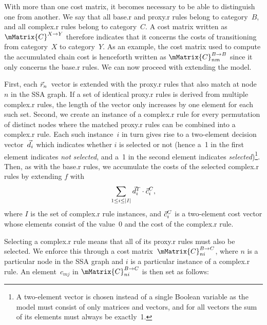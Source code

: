 With more than one cost matrix, it becomes necessary to be able to distinguish
one from another.
%
\newcommand{\mCategory}[1]{#1}
%
We say that all \gls{base.r} and \gls{proxy.r} \glspl{rule} belong to
category~$\mCategory{B}$, and all \gls{complex.r} \glspl{rule} belong to
category~$\mCategory{C}$.
%
A cost matrix written as $\mMatrix{C}^{\mCategory{X}
  \rightarrow \mCategory{Y}}$ therefore indicates that it concerns the costs of
transitioning from category~$\mCategory{X}$ to category~$\mCategory{Y}$.
%
As an
example, the cost matrix used to compute the accumulated chain cost is
henceforth written as $\mMatrix{C}_{nm}^{\mCategory{B} \rightarrow
  \mCategory{B}}$ since it only concerns the \gls{base.r} \glspl{rule}.
%
We can now proceed
with extending the  model.

First, each $\vec{r}_n$~vector is extended with the \gls{proxy.r} \glspl{rule} that also
match at \gls{node}~$n$ in the \gls{SSA graph}.
%
If a set of identical
\gls{proxy.r} \glspl{rule} is derived from multiple \gls{complex.r} \glspl{rule}, the length of the vector
only increases by one element for each such set.
%
Second, we create an instance
of a \gls{complex.r} \gls{rule} for every permutation of distinct \glspl{node} where the
matched \gls{proxy.r} \glspl{rule} can be combined into a \gls{complex.r} \gls{rule}.
%
Each such
instance~$i$ in turn gives rise to a \mbox{two-element} decision
vector~$\vec{d}_i$ which indicates whether $i$ is selected or not (hence a~1
in the first element indicates \emph{not selected}, and a~1 in the second
element indicates \emph{selected})\footnote{A \mbox{two-element} vector is
  chosen instead of a single Boolean variable as the 
  model must consist of only matrices and vectors, and for all vectors the sum
  of its elements must always be exactly~1.}.
%
Then, as with the \gls{base.r} \glspl{rule}, we
accumulate the costs of the selected \gls{complex.r} \glspl{rule} by extending $f$ with
\begin{displaymath}
  \sum_{1 \leq i \leq |I|} \mVector{d}_i^T \cdot
  \mVector{c}_i^{\mCategory{C}},
\end{displaymath}
where $I$ is the set of \gls{complex.r} \gls{rule} instances, and
$\mVector{c}_i^{\mCategory{C}}$ is a \mbox{two-element} cost vector whose
elements consist of the value~0 and the cost of the \gls{complex.r} \gls{rule}.

Selecting a \gls{complex.r} \gls{rule} means that all of its \gls{proxy.r} \glspl{rule} must also be
selected.
%
We enforce this through a cost matrix~$\mMatrix{C}_{ni}^{\mCategory{B}
  \rightarrow \mCategory{C}}$, where $n$ is a particular \gls{node} in the
\gls{SSA graph} and $i$ is a particular instance of a \gls{complex.r} \gls{rule}.
%
An
element~$c_{mj}$ in $\mMatrix{C}_{ni}^{\mCategory{B} \rightarrow \mCategory{C}}$
is then set as follows:

